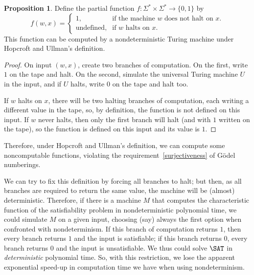 \documentclass[12pt]{article}
\theoremstyle{definition}
\newtheorem{proposition}[definition]{Proposition}
\begin{document}
\vspace{6pt}
\begin{proposition}
    Define the partial function $f: \Sigma^* \times \Sigma^* \to \{0, 1\}$ by
    \begin{equation*}
        f(w, x) = \begin{cases}
            1, & \text{if the machine $w$ does not halt on $x$.} \\
            \text{undefined}, &\text{if $w$ halts on $x$.}
        \end{cases}
    \end{equation*}
    This function can be computed by a nondeterministic Turing machine
    under Hopcroft and Ullman's definition.
\end{proposition}

\begin{proof}
    On input $(w, x)$,
    create two branches of computation.
    On the first, write $1$ on the tape and halt.
    On the second, simulate the universal Turing machine $U$ in the input,
    and if $U$ halts, write $0$ on the tape and halt too.

    If $w$ halts on $x$,
    there will be two halting branches of computation,
    each writing a different value in the tape,
    so, by definition, the function is not defined on this input.
    If $w$ never halts,
    then only the first branch will halt
    (and with $1$ written on the tape),
    so the function is defined on this input and its value is $1$.
\end{proof}
Therefore, under Hopcroft and Ullman's definition,
we can compute some noncomputable functions,
violating the requirement~\ref{surjectiveness} of Gödel numberings.

We can try to fix this definition by forcing all branches to halt;
but then, as all branches are required to return the same value,
the machine will be (almost) deterministic.
Therefore, if there is a machine $M$ that computes the characteristic function
of the satisfiability problem in nondeterministic polynomial time,
we could simulate $M$ on a given input,
choosing (say) always the first option when confronted with nondeterminism.
If this branch of computation returns $1$,
then every branch returns $1$ and the input is satisfiable;
if this branch returns $0$, every branch returns $0$ and the input is unsatisfiable.
We thus could solve $\SAT$ in \emph{deterministic} polynomial time.
So, with this restriction,
we lose the apparent exponential speed-up in computation time
we have when using nondeterminism.
\end{document}
